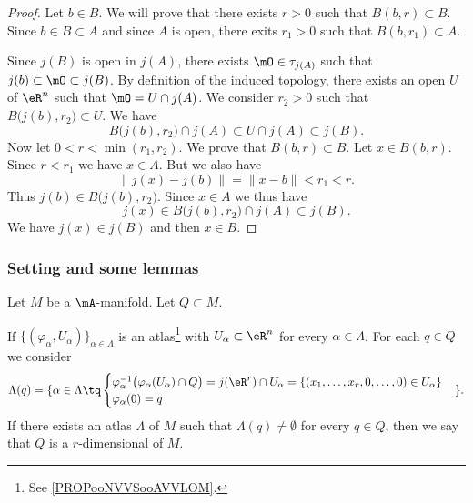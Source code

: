 \begin{proof}
	Let \( b\in B\). We will prove that there exists \( r>0\) such that \( B(b,r)\subset B\). Since \( b\in B\subset A\) and since \( A\) is open, there exits \( r_1>0\) such that \( B(b,r_1)\subset A\).

	Since \( j(B)\) is open in \( j(A)\), there exists \( \mO\in\tau_{j(A)}\) such that \( j(b)\subset\mO\subset j(B)\). By definition of the induced topology, there exists an open \( U\) of \( \eR^n\) such that \( \mO=U\cap j(A)\). We consider \( r_2>0\) such that \( B\big( j(b),r_2 \big)\subset U\). We have
	\begin{equation}
		B\big( j(b),r_2 \big)\cap j(A)\subset U\cap j(A)\subset j(B).
	\end{equation}
	Now let \( 0<r<\min(r_1,r_2)\). We prove that \( B(b,r)\subset B\). Let \( x\in B(b,r)\). Since \( r<r_1\) we have \( x\in A\). But we also have
	\begin{equation}
		\| j(x)-j(b) \|=\| x-b \|<r_1<r.
	\end{equation}
	Thus \( j(b)\in B\big( j(b),r_2 \big)\). Since \( x\in A\) we thus have
	\begin{equation}
		j(x)\in B\big( j(b),r_2 \big)\cap j(A)\subset j(B).
	\end{equation}
	We have \( j(x)\in j(B)\) and then \( x\in B\).
\end{proof}

\subsubsection{Setting and some lemmas}



\begin{definition}[submanifold]      \label{DEFooLQHWooMOTgzq}
	Let \( M\) be a \( \mA\)-manifold. Let \( Q\subset M\).

	If \( \{ (\varphi_{\alpha},U_{\alpha}) \}_{\alpha\in \Lambda}\) is an atlas\footnote{See \ref{PROPooNVVSooAVVLOM}.} with \( U_{\alpha}\subset \eR^n\) for every \( \alpha\in \Lambda\). For each \( q\in Q\) we consider
	\begin{equation}		\label{EQooPIPMooWqyrsn}
		\Lambda(q)=\{ \alpha\in\Lambda\tq
		\begin{cases}
			\varphi_{\alpha}^{-1}\big( \varphi_{\alpha}(U_{\alpha})\cap Q \big)= j(\eR^r)\cap U_{\alpha} = \{ (x_1,\ldots,x_r,0,\ldots,0)\in U_{\alpha} \} \\
			\varphi_{\alpha}(0)=q
		\end{cases}
		\}.
	\end{equation}
	If there exists an atlas \( \Lambda\) of \( M\) such that \( \Lambda(q)\neq\emptyset\) for every \( q\in Q\), then we say that \( Q\) is a \( r\)-dimensional  of \( M\).
\end{definition}

